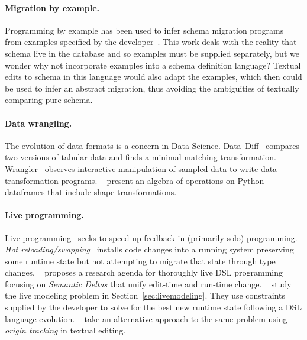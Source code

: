 \documentclass[english,crc]{programming}
\newcommand{\citet}[1]{\citeauthor*{#1}~\cite{#1}}
\begin{document}
\paragraph{Migration by example.}
Programming by example has been used to infer schema migration programs from examples specified by the developer~\cite{wang20, Alexe11}.
This work deals with the reality that schema live in the database and so examples must be supplied separately, but we wonder why not incorporate examples into a schema definition language? Textual edits to schema in this language would also adapt the examples, which then could be used to infer an abstract migration, thus avoiding the ambiguities of textually comparing pure schema.

\paragraph{Data wrangling.} The evolution of data formats is a concern in Data Science. Data~Diff~\cite{sutton18} compares two versions of tabular data and finds a minimal matching transformation.
Wrangler~\cite{kandel11} observes interactive manipulation of sampled data to write data transformation programs.
\citet{petersohn20} present an algebra of operations on Python dataframes that include shape transformations.

\paragraph{Live programming.}
Live programming~\cite{tanimoto90, rein2018exploratory, HazelnutLive19} seeks to speed up feedback in (primarily solo) programming.
\emph{Hot reloading/swapping}~\cite{barenz2020essence, hicks2005dynamic} installs code changes into a running system preserving some runtime state but not attempting to migrate that state through type changes.
\citet{SemanticDeltas} proposes a research agenda for thoroughly live DSL programming focusing on \emph{Semantic Deltas} that unify edit-time and run-time change.
\citet{RuntimeConstraint} study the live modeling problem in Section~\ref{sec:livemodeling}. They use constraints supplied by the developer to solve for the best new runtime state following a DSL language evolution. \citet{vanRozen19} take an alternative approach to the same problem using \emph{origin tracking} in textual editing.


\end{document}
